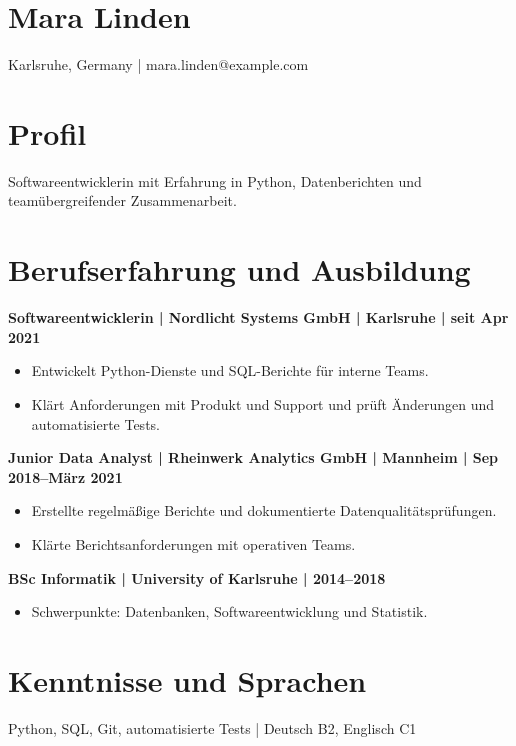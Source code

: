 \documentclass[11pt,a4paper]{article}
\begin{document}
\section*{Mara Linden}
Karlsruhe, Germany | mara.linden@example.com\par
\section*{Profil}
Softwareentwicklerin mit Erfahrung in Python, Datenberichten und teamübergreifender Zusammenarbeit.\par
\section*{Berufserfahrung und Ausbildung}
\textbf{Softwareentwicklerin | Nordlicht Systems GmbH | Karlsruhe | seit Apr 2021}\par
\begin{itemize}
\item Entwickelt Python-Dienste und SQL-Berichte für interne Teams.
\item Klärt Anforderungen mit Produkt und Support und prüft Änderungen und automatisierte Tests.
\end{itemize}
\textbf{Junior Data Analyst | Rheinwerk Analytics GmbH | Mannheim | Sep 2018--März 2021}\par
\begin{itemize}
\item Erstellte regelmäßige Berichte und dokumentierte Datenqualitätsprüfungen.
\item Klärte Berichtsanforderungen mit operativen Teams.
\end{itemize}
\textbf{BSc Informatik | University of Karlsruhe | 2014--2018}\par
\begin{itemize}
\item Schwerpunkte: Datenbanken, Softwareentwicklung und Statistik.
\end{itemize}
\section*{Kenntnisse und Sprachen}
Python, SQL, Git, automatisierte Tests | Deutsch B2, Englisch C1\par
\end{document}
